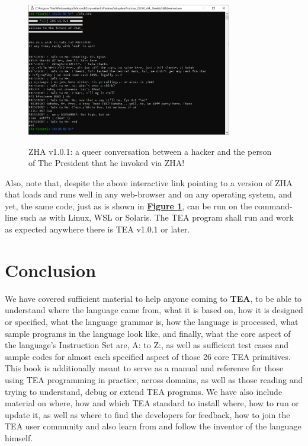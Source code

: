 \documentclass[a4paper, 18pt]{book} %
\begin{document}
  \begin{figure}[H]
      \centering
      \includegraphics[width=0.8\textwidth,]{resources/images/zha3.png}\\
        \caption{ZHA v1.0.1: a queer conversation between a hacker and the person of The President that he invoked via ZHA!}
      \label{FIGZHA}
    \end{figure}
  

Also, note that, despite the above interactive link pointing to a version of ZHA that loads and runs well in any web-browser and on any operating system, and yet, the same code, just as is shown in  \textbf{\hyperref[FIGZHA]{Figure \ref{FIGZHA}}}, can be run on the command-line such as with Linux, WSL or Solaris. The TEA program shall run and work as expected anywhere there is TEA v1.0.1 or later.




\chapter{Conclusion}
\label{SECCONC}



We have covered sufficient material to help anyone coming to \textbf{TEA}, to be able to understand where the language came from, what it is based on, how it is designed or specified, what the language grammar is, how the language is processed, what sample programs in the language look like, and finally, what the core aspect of the language's Instruction Set are, A: to Z:, as well as sufficient test cases and sample codes for almost each specified aspect of those 26 core TEA primitives. This book is additionally meant to serve as a manual and reference for those using TEA programming in practice, across domains, as well as those reading and trying to understand, debug or extend TEA programs. We have also include material on where, how and which TEA standard to install where, how to run or update it, as well as where to find the developers for feedback, how to join the TEA user community and also learn from and follow the inventor of the language himself.
\end{document}
